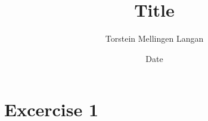 \documentclass{article}
\title{Title}
\author{Torstein Mellingen Langan}
\date{Date}
\begin{document}
\maketitle

\section{Excercise 1}
\label{sec:ex1}
\end{document}
